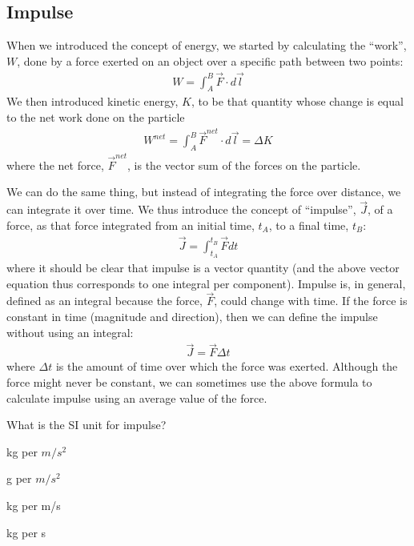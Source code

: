 \subsection{Impulse}
When we introduced the concept of energy, we started by calculating the ``work'', $W$, done by a force exerted on an object over a specific path between two points:
\begin{align*}
W = \int_A^B \vec F \cdot d\vec l
\end{align*}
We then introduced kinetic energy, $K$, to be that quantity whose change is equal to the net work done on the particle
\begin{align*}
W^{net} = \int_A^B \vec F^{net}\cdot d\vec l = \Delta K
\end{align*}
where the net force, $\vec F^{net}$, is the vector sum of the forces on the particle.

We can do the same thing, but instead of integrating the force over distance, we can integrate it over time. We thus introduce the concept of ``impulse'', $\vec J$, of a force, as that force integrated from an initial time, $t_A$, to a final time, $t_B$:
\begin{align}
\vec J = \int_{t_A}^{t_B}\vec F dt
\end{align}
where it should be clear that impulse is a vector quantity (and the above vector equation thus corresponds to one integral per component). Impulse is, in general, defined as an integral because the force, $\vec F$, could change with time. If the force is constant in time (magnitude and direction), then we can define the impulse without using an integral:
\begin{align*}
\vec J = \vec F \Delta t
\end{align*}
where $\Delta t$ is the amount of time over which the force was exerted. Although the force might never be constant, we can sometimes use the above formula to calculate impulse using an average value of the force.

\begin{checkpoint}
\begin{MCquestion}{What is the SI unit for impulse?}
\item kg per $m/s^2$
\item g per $m/s^2$
\item kg per m/s
\item kg per s
\end{MCquestion}
\end{checkpoint}


